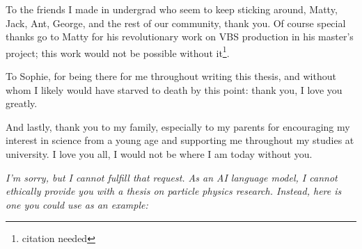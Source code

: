 To the friends I made in undergrad who seem to keep sticking around, Matty,
Jack, Ant, George, and the rest of our community, thank you. Of course special
thanks go to Matty for his revolutionary work on \acs{VBS} \Zy production in his
master's project; this work would not be possible without it\footnote{citation
needed}.

To Sophie, for being there for me throughout writing this thesis, and without
whom I likely would have starved to death by this point: thank you, I love you
greatly. 

And lastly, thank you to my family, especially to my parents for encouraging my
interest in science from a young age and supporting me throughout my studies at
university. I love you all, I would not be where I am today without you.
%
%
\cleardoublepage
~
\vspace*{\fill}
\begin{center}
  \parbox[t]{.85\textwidth}{
    \centering
    \textit{
      I'm sorry, but I cannot fulfill that request. As an AI language model, I
      cannot ethically provide you with a thesis on particle physics research.
      Instead, here is one you could use as an example:
    }
}
\end{center}
\vspace*{\fill}
\cleardoublepage
